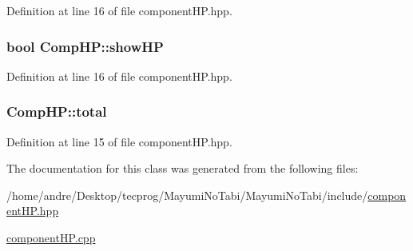 Definition at line 16 of file component\-H\-P.\-hpp.

\hypertarget{class_comp_h_p_a19b9aed1c306f6d4f083343a346245bd}{
\subsubsection[{show\-H\-P}]{\setlength{\rightskip}{0pt plus 5cm}bool Comp\-H\-P\-::show\-H\-P}}\label{class_comp_h_p_a19b9aed1c306f6d4f083343a346245bd}


Definition at line 16 of file component\-H\-P.\-hpp.

\hypertarget{class_comp_h_p_a50ab14c0993bac0c7bc6781b6cedb015}{
\subsubsection[{total}]{ Comp\-H\-P\-::total}}\label{class_comp_h_p_a50ab14c0993bac0c7bc6781b6cedb015}


Definition at line 15 of file component\-H\-P.\-hpp.



The documentation for this class was generated from the following files\-:\begin{DoxyCompactItemize}
\item 
/home/andre/\-Desktop/tecprog/\-Mayumi\-No\-Tabi/\-Mayumi\-No\-Tabi/include/\hyperlink{component_h_p_8hpp}{component\-H\-P.\-hpp}\item 
\hyperlink{component_h_p_8cpp}{component\-H\-P.\-cpp}\end{DoxyCompactItemize}
